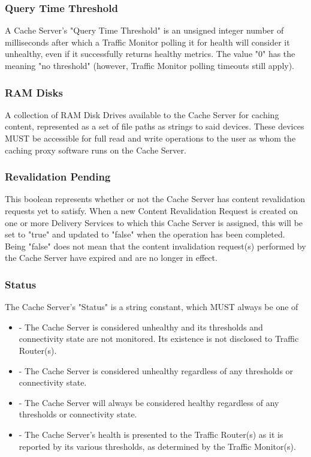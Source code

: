 \subsubsection{Query Time Threshold}
A Cache Server's "Query Time Threshold" is an unsigned integer number of
milliseconds after which a Traffic Monitor polling it for health will consider
it unhealthy, even if it successfully returns healthy metrics. The value "0" has
the meaning "no threshold" (however, Traffic Monitor polling timeouts still
apply).

\subsubsection{RAM Disks}
A collection of RAM Disk Drives available to the Cache Server for caching
content, represented as a set of file paths as strings to said devices. These
devices MUST be accessible for full read and write operations to the user as
whom the caching proxy software runs on the Cache Server.

\subsubsection{Revalidation Pending}
This boolean represents whether or not the Cache Server has content revalidation
requests yet to satisfy. When a new Content Revalidation Request is created on
one or more Delivery Services to which this Cache Server is assigned, this will
be set to "true" and updated to "false" when the operation has been completed.
Being "false" does not mean that the content invalidation request(s) performed
by the Cache Server have expired and are no longer in effect.

\subsubsection{Status}
The Cache Server's "Status" is a string constant, which MUST always be one of

\begin{itemize}
	\item {} - The Cache Server is considered unhealthy and its
	thresholds and connectivity state are not monitored. Its existence is not
	disclosed to Traffic Router(s).
	\item {} - The Cache Server is considered unhealthy regardless
	of any thresholds or connectivity state.
	\item {} - The Cache Server will always be considered healthy
	regardless of any thresholds or connectivity state.
	\item {} - The Cache Server's health is presented to the
	Traffic Router(s) as it is reported by its various thresholds, as determined
	by the Traffic Monitor(s).
\end{itemize}

